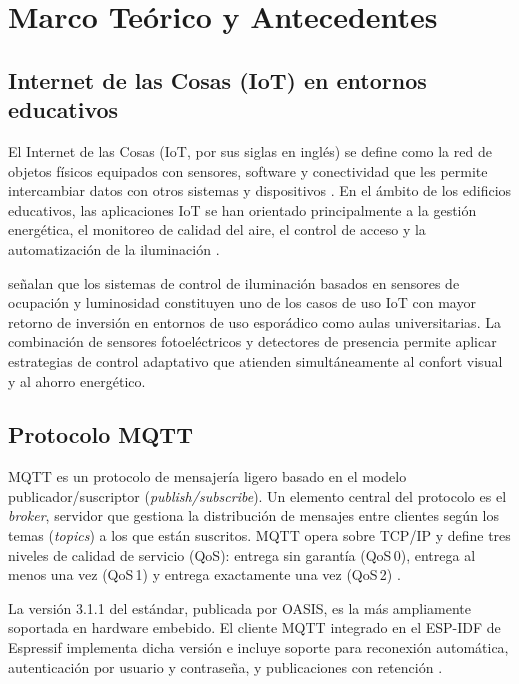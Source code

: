 
\section{Marco Teórico y Antecedentes}
\label{sec:marco}

\subsection{Internet de las Cosas (IoT) en entornos educativos}

El Internet de las Cosas (IoT, por sus siglas en inglés) se define como la red de
objetos físicos equipados con sensores, software y conectividad que les permite
intercambiar datos con otros sistemas y dispositivos \parencite{Atzori2010}. En el
ámbito de los edificios educativos, las aplicaciones IoT se han orientado
principalmente a la gestión energética, el monitoreo de calidad del aire, el control
de acceso y la automatización de la iluminación \parencite{Jia2019}.

\textcite{Shaikh2014} señalan que los sistemas de control de iluminación basados
en sensores de ocupación y luminosidad constituyen uno de los casos de uso IoT con
mayor retorno de inversión en entornos de uso esporádico como aulas universitarias.
La combinación de sensores fotoeléctricos y detectores de presencia permite aplicar
estrategias de control adaptativo que atienden simultáneamente al confort visual y
al ahorro energético.

\subsection{Protocolo MQTT}

MQTT es un protocolo de mensajería ligero basado en el modelo publicador/suscriptor
(\textit{publish/subscribe}). Un elemento central del protocolo es el
\textit{broker}, servidor que gestiona la distribución de mensajes entre clientes
según los temas (\textit{topics}) a los que están suscritos. MQTT opera sobre TCP/IP
y define tres niveles de calidad de servicio (QoS): entrega sin garantía (QoS\,0),
entrega al menos una vez (QoS\,1) y entrega exactamente una vez (QoS\,2)
\parencite{Banks2019}.

La versión 3.1.1 del estándar, publicada por OASIS, es la más ampliamente soportada
en hardware embebido. El cliente MQTT integrado en el ESP-IDF de Espressif
implementa dicha versión e incluye soporte para reconexión automática,
autenticación por usuario y contraseña, y publicaciones con retención
\parencite{Espressif2024}.

